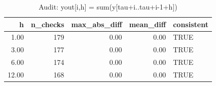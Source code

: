 \begin{table}[ht]
\centering
\begin{tabular}{rrrrl}
  \hline
h & n\_checks & max\_abs\_diff & mean\_diff & consistent \\ 
  \hline
1.00 & 179 & 0.00 & 0.00 & TRUE \\ 
  3.00 & 177 & 0.00 & 0.00 & TRUE \\ 
  6.00 & 174 & 0.00 & 0.00 & TRUE \\ 
  12.00 & 168 & 0.00 & 0.00 & TRUE \\ 
   \hline
\end{tabular}
\caption{Audit: yout[i,h] = sum(y[tau+i..tau+i-1+h])} 
\label{tab:audit_yout}
\end{table}
